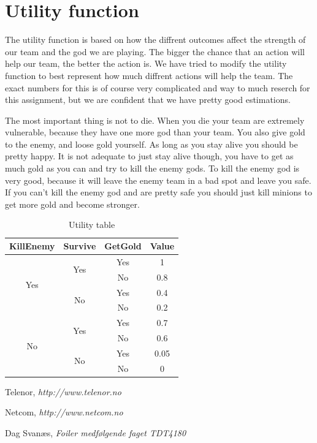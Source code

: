 \documentclass[titlepage]{article}
\begin{document}
\newpage

\section{Utility function}The utility function is based on how the diffrent outcomes affect the strength of our team and the god we are playing. The bigger the chance that an action will help our team, the better the action is. We have tried to modify the utility function to best represent how much diffrent actions will help the team. The exact numbers for this is of course very complicated and way to much reserch for this assignment, but we are confident that we have pretty good estimations. 

The most important thing is not to die. When you die your team are extremely vulnerable, because they have one more god than your team. You also give gold to the enemy, and loose gold yourself. As long as you stay alive you should be pretty happy. It is not adequate to just stay alive though, you have to get as much gold as you can and try to kill the enemy gods. To kill the enemy god is very good, because it will leave the enemy team in a bad spot and leave you safe. If you can't kill the enemy god and are pretty safe you should just kill minions to get more gold and become stronger.

\begin{table}[H]
\centering
\begin{tabular}{ |c|c|c|c| }

\hline
KillEnemy & Survive & GetGold & Value \\ \hline
\multirow{4}{*}{Yes} & \multirow{2}{*}{Yes} & Yes & 1 \\ \cline{3-4}
 & & No & 0.8 \\ \cline{2-4}
 & \multirow{2}{*}{No} & Yes & 0.4 \\ \cline{3-4}
 & & No & 0.2 \\ \hline

 \multirow{4}{*}{No} & \multirow{2}{*}{Yes} & Yes & 0.7 \\ \cline{3-4}
 & & No & 0.6 \\ \cline{2-4}
 & \multirow{2}{*}{No} & Yes & 0.05 \\ \cline{3-4}
 & & No & 0 \\ \hline
\end{tabular}
\caption{Utility table}
\end{table}


\begin{thebibliography}{9}

	Telenor,
	\emph{http://www.telenor.no}

	Netcom,
	\emph{http://www.netcom.no}

	Dag Svanæs,
	\emph{Foiler medfølgende faget TDT4180}
\end{thebibliography}
\end{document}

